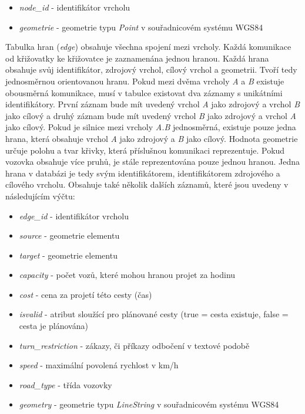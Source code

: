 \vspace{10pt}
\begin{itemize}
  \item \textit{node\_id} - identifikátor vrcholu
  \item \textit{geometrie} - geometrie typu \textit{Point} v souřadnicovém systému WGS84
\end{itemize}
\vspace{10pt}

Tabulka hran (\textit{edge}) obsahuje všechna spojení mezi vrcholy. Každá komunikace od křižovatky ke křižovatce je zaznamenána jednou hranou. Každá hrana obsahuje svůj identifikátor, zdrojový vrchol, cílový vrchol a geometrii. Tvoří tedy jednosměrnou orientovanou hranu. Pokud mezi dvěma vrcholy \textit{A} a \textit{B} existuje obousměrná komunikace, musí v tabulce existovat dva záznamy s unikátními identifikátory. První záznam bude mít uvedený vrchol \textit{A} jako zdrojový a vrchol \textit{B} jako cílový a druhý záznam bude mít uvedený vrchol \textit{B} jako zdrojový a vrchol \textit{A} jako cílový. Pokud je silnice mezi vrcholy \textit{A.B} jednosměrná, existuje pouze jedna hrana, která obsahuje vrchol \textit{A} jako zdrojový a \textit{B} jako cílový. Hodnota geometrie určuje polohu a tvar křivky, která příslušnou komunikaci reprezentuje. Pokud vozovka obsahuje více pruhů, je stále reprezentována pouze jednou hranou. Jedna hrana v databázi je tedy svým identifikátorem, identifikátorem zdrojového a cílového vrcholu. Obsahuje také několik dalších záznamů, které jsou uvedeny v následujícím výčtu:   

\vspace{10pt}
\begin{itemize}
  \item \textit{edge\_id} - identifikátor vrcholu
  \item \textit{source} - geometrie elementu
  \item \textit{target} - geometrie elementu
  \item \textit{capacity} - počet vozů, které mohou hranou projet za hodinu
  \item \textit{cost} - cena za projetí této cesty (čas)
  \item \textit{isvalid} - atribut sloužící pro plánované cesty (true = cesta existuje, false = cesta je plánována)
  \item \textit{turn\_restriction} - zákazy, či příkazy odbočení v textové podobě
  \item \textit{speed} - maximální povolená rychlost v km/h
  \item \textit{road\_type} - třída vozovky
  \item \textit{geometry} - geometrie typu \textit{LineString} v souřadnicovém systému WGS84
\end{itemize}
\vspace{10pt}

